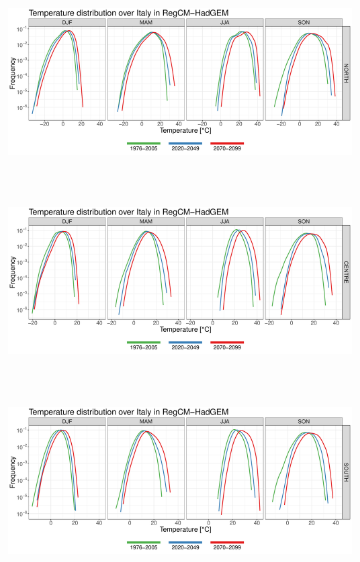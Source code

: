 \begin{figure}
    \centering
    \begin{subfigure}{0.8\textwidth}
        \includegraphics[width=\textwidth]{figures/change_rcm/tas/pdf_NORTH_lines}
    \end{subfigure}\\
    \begin{subfigure}{0.8\textwidth}
        \includegraphics[width=\textwidth]{figures/change_rcm/tas/pdf_CENTRE_lines}
    \end{subfigure}\\
    \begin{subfigure}{0.8\textwidth}
        \includegraphics[width=\textwidth]{figures/change_rcm/tas/pdf_SOUTH_lines}
    \end{subfigure}\\
    \begin{subfigure}{0.8\textwidth}

\end{subfigure}
\end{figure}
